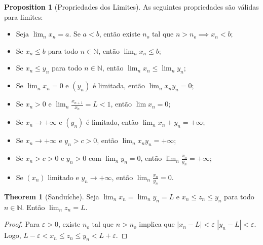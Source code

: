 \documentclass[10pt]{article}
\theoremstyle{definition}
\newtheorem{theorem}{Theorem}
\newtheorem{proposition}{Proposition}
\begin{document}
\begin{proposition}[Propriedades dos Limites]
	As seguintes propriedades são válidas para limites:
	\begin{itemize}
		\item Seja $\lim_n x_n = a$. Se $a<b$, então existe $n_o$ tal que $n>n_o \implies x_n < b$;
		\item Se $x_n \leq b$ para todo $n \in \mathbb N$, então $\lim_n x_n \leq b$;
		\item Se $x_n \leq y_n$ para todo $n \in \mathbb N$, então $\lim_n x_n \leq \lim_n y_n$;
		\item Se $\lim_n x_n = 0$ e $(y_n)$ é limitada, então $\lim_n x_n y_n =0 $;
		\item Se $x_n>0$ e $\lim_n \frac{x_{n+1}}{x_n} = L < 1$, então $\lim x_n = 0$;
		\item Se $x_n \to +\infty$ e $(y_n)$ é limitado, então $\lim_n x_n + y_n = +\infty$;
		\item Se $x_n \to +\infty$ e $y_n > c > 0$, então $\lim_n x_n y_n = +\infty$;
		\item Se $x_n > c >0$ e $y_n >0$ com $\lim_n y_n = 0$, então $\lim_n \frac{x_n}{y_n}= +\infty$;
		\item Se $(x_n)$ limitado e $y_n \to +\infty$, então $\lim_n \frac{x_n}{y_n} = 0$.
	\end{itemize}
\end{proposition}

\begin{theorem}[Sanduíche]
	Seja $\lim_n x_n = \lim_n y_n = L$ e $x_n \leq z_n \leq y_n$ para todo $n \in \mathbb N$. Então
	$\lim_n z_n = L$.
\end{theorem}
\begin{proof}
	Para $\varepsilon > 0$, existe $n_o$ tal que $n>n_o$ implica que
	$|x_n - L| < \varepsilon$
	$|y_n - L| < \varepsilon$. Logo, $L - \varepsilon < x_n \leq z_n \leq y_n < L + \varepsilon$.
\end{proof}
\end{document}
